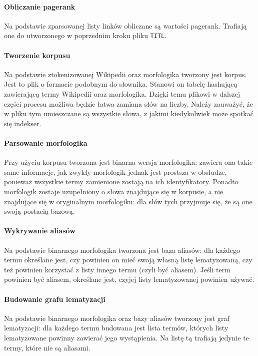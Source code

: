 \documentclass[a4paper,12pt]{article}
\begin{document}
\paragraph{Obliczanie pagerank} Na podstawie zparsowanej listy linków obliczane
są wartości pagerank. Trafiają one do utworzonego w poprzednim kroku pliku
\texttt{TITL}.

\paragraph{Tworzenie korpusu} Na podstawie ztokenizowanej Wikipedii oraz
morfologika tworzony jest korpus. Jest to plik o formacie podobnym do
słownika. Stanowi on tabelę hashującą zawierającą termy Wikipedii oraz
morfologika. Dzięki temu plikowi w dalszej części procesu możliwa będzie
łatwa zamiana słów na liczby. Należy zauważyć, że w pliku tym umieszczane są
wszystkie słowa, z jakimi kiedykolwiek może spotkać się indekser.

\paragraph{Parsowanie morfologika} Przy użyciu korpusu tworzona jest binarna
wersja morfologika: zawiera ona takie same informacje, jak zwykły morfologik
jednak jest prostsza w obsłudze, ponieważ wszystkie termy zamienione zostają
na ich identyfikatory. Ponadto morfologik zostaje uzupełniony o słowa
znajdujące się w korpusie, a nie znajdujące się w oryginalnym morfologiku:
dla słów tych przyjmuje się, że są one swoją postacią bazową.

\paragraph{Wykrywanie aliasów} Na podstawie binarnego morfologika tworzona
jest baza aliasów: dla każdego termu określane jest, czy powinien on mieć
swoją własną listę lematyzowaną, czy też powinien korzystać z listy innego
termu (czyli być aliasem). Jeśli term powinien być aliasem, określane jest,
czyjej listy lematyzowanej powinien używać.

\paragraph{Budowanie grafu lematyzacji} Na podstawie binarnego morfologika
oraz bazy aliasów tworzony jest graf lematyzacji: dla każdego termu budowana
jest lista termów, których listy lematyzowane powinny zawierać jego
wystąpienia. Na listę tą trafiają jedynie te termy, które nie są aliasami.
\end{document}
